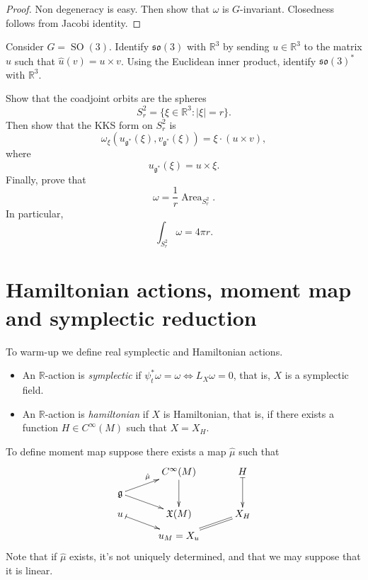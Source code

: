 \begin{proof}
Non degeneracy is easy.
Then show that $\omega$ is $G$-invariant.
Closedness follows from Jacobi identity.
\end{proof}

\begin{exercise}
\label{exercise-kks-so3-sphere}
Consider $G=\operatorname{SO}(3)$.
Identify $\mathfrak{so}(3)$ with
$\mathbb{R}^3$ by sending $u\in\mathbb{R}^3$
to the matrix $\hat u$ such that
$\hat u(v)=u\times v$.
Using the Euclidean inner product, identify
$\mathfrak{so}(3)^*$ with $\mathbb{R}^3$.

Show that the coadjoint orbits are the
spheres
$$
S_r^2=\{\xi\in\mathbb{R}^3:|\xi|=r\}.
$$
Then show that the KKS form on $S_r^2$ is
$$
\omega_\xi(u_{\mathfrak g^*}(\xi),
v_{\mathfrak g^*}(\xi))
=
\xi\cdot(u\times v),
$$
where
$$
u_{\mathfrak g^*}(\xi)=u\times \xi.
$$
Finally, prove that
$$
\omega=\frac{1}{r}\operatorname{Area}_{S_r^2}.
$$
In particular,
$$
\int_{S_r^2}\omega=4\pi r.
$$
\end{exercise}

\section{Hamiltonian actions, moment map
and symplectic reduction}
\label{section-reduction}

\noindent
To warm-up we define real symplectic and
Hamiltonian actions.

\begin{definition}
\label{definition-one-parameter-actions}
\begin{itemize}
\item An $\mathbb{R}$-action is {\it
symplectic}
if $\psi_t^*\omega=\omega
\iff L_X \omega=0$,
that is, $X$ is a symplectic field.
\item An $\mathbb{R}$-action is {\it
hamiltonian}
if $X$ is Hamiltonian,
that is, if there exists
a function $H \in C^\infty(M)$ such that
$X=X_H$.
\end{itemize}
\end{definition}

\noindent
To define moment map suppose
there exists a map $\hat{\mu}$
such that
$$
\xymatrix@C=3em@R=.7em{
&C^\infty(M)\ar[dd]&H\ar@{|->}[dd]\\
\mathfrak{g}\ar[dr]\ar[ur]^{\hat{\mu}}\\
u \ar@{|->}[dr] & \mathfrak{X}(M) & X_H\\
& u_M=X_u \ar@{=}[ur]
}
$$
Note that if  $\hat{\mu}$ exists, it's not
uniquely determined, and that we may suppose
that it is linear.

